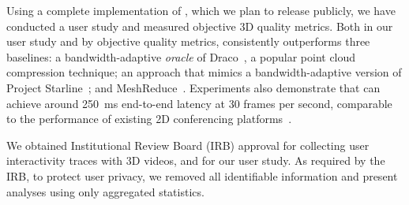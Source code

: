 Using a complete implementation of \livo, which we plan to release publicly, we have conducted a user study and measured objective 3D quality metrics.
%
Both in our user study and by objective quality metrics, \livo{} consistently outperforms three baselines: a bandwidth-adaptive \textit{oracle} of Draco~\cite{draco}, a popular point cloud compression technique; an approach that mimics a bandwidth-adaptive version of Project Starline~\cite{starline}; and MeshReduce~\cite{meshreduce}.
%
Experiments also demonstrate that \livo can achieve around 250~ms end-to-end latency at 30 frames per second, comparable to the performance of existing 2D conferencing platforms~\cite{videoconf-benchmark,converge-sigcomm-2023}. %
%

 We obtained Institutional Review Board (IRB) approval for collecting user interactivity traces with 3D videos, and for our user study. As required by the IRB, to protect user privacy, we removed all identifiable information and present analyses using only aggregated statistics.


